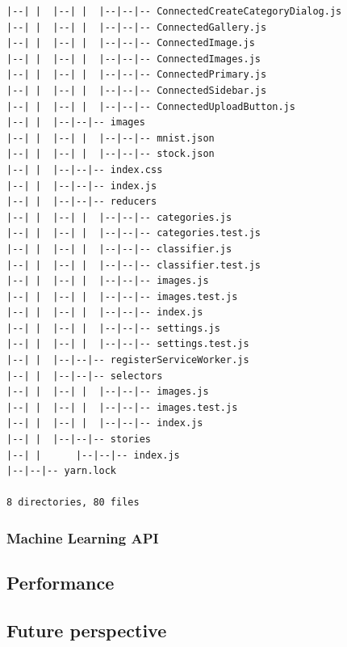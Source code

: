 \begin{verbatim}
|--| |  |--| |  |--|--|-- ConnectedCreateCategoryDialog.js
|--| |  |--| |  |--|--|-- ConnectedGallery.js
|--| |  |--| |  |--|--|-- ConnectedImage.js
|--| |  |--| |  |--|--|-- ConnectedImages.js
|--| |  |--| |  |--|--|-- ConnectedPrimary.js
|--| |  |--| |  |--|--|-- ConnectedSidebar.js
|--| |  |--| |  |--|--|-- ConnectedUploadButton.js
|--| |  |--|--|-- images
|--| |  |--| |  |--|--|-- mnist.json
|--| |  |--| |  |--|--|-- stock.json
|--| |  |--|--|-- index.css
|--| |  |--|--|-- index.js
|--| |  |--|--|-- reducers
|--| |  |--| |  |--|--|-- categories.js
|--| |  |--| |  |--|--|-- categories.test.js
|--| |  |--| |  |--|--|-- classifier.js
|--| |  |--| |  |--|--|-- classifier.test.js
|--| |  |--| |  |--|--|-- images.js
|--| |  |--| |  |--|--|-- images.test.js
|--| |  |--| |  |--|--|-- index.js
|--| |  |--| |  |--|--|-- settings.js
|--| |  |--| |  |--|--|-- settings.test.js
|--| |  |--|--|-- registerServiceWorker.js
|--| |  |--|--|-- selectors
|--| |  |--| |  |--|--|-- images.js
|--| |  |--| |  |--|--|-- images.test.js
|--| |  |--| |  |--|--|-- index.js
|--| |  |--|--|-- stories
|--| |      |--|--|-- index.js
|--|--|-- yarn.lock

8 directories, 80 files
\end{verbatim}

\subsubsection{Machine Learning API}

\subsection{Performance}

\subsection{Future perspective}




